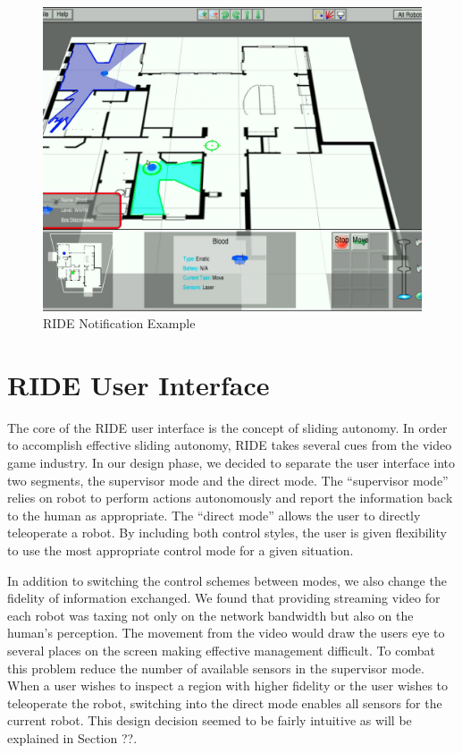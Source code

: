 \begin{figure}[ht]
\begin{center}
\includegraphics[width=6.10in]{images/ride-notification.png}
\caption{RIDE Notification Example\label{fig:ride-notification}}
\end{center}
\end{figure}

\section{RIDE User Interface}

The core of the RIDE user interface is the concept of sliding autonomy. In order to accomplish effective sliding autonomy, RIDE takes several cues from the video game industry. In our design phase, we decided to separate the user interface into two segments, the supervisor mode and the direct mode. The ``supervisor mode'' relies on robot to perform actions autonomously and report the information back to the human as appropriate. The ``direct mode'' allows the user to directly teleoperate a robot. By including both control styles, the user is given flexibility to use the most appropriate control mode for a given situation.

In addition to switching the control schemes between modes, we also change the fidelity of information exchanged. We found that providing streaming video for each robot was taxing not only on the network bandwidth but also on the human's perception. The movement from the video would draw the users eye to several places on the screen making effective management difficult. To combat this problem reduce the number of available sensors in the supervisor mode. When a user wishes to inspect a region with higher fidelity or the user wishes to teleoperate the robot, switching into the direct mode enables all sensors for the current robot. This design decision seemed to be fairly intuitive as will be explained in Section ??.

